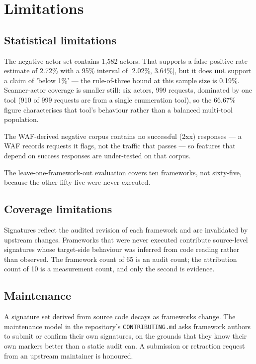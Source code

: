 \documentclass[11pt]{article}
\begin{document}
\section{Limitations}
\label{sec:limits}

\subsection{Statistical limitations}
\label{sec:statlimits}

The negative actor set contains 1,582 actors. That supports a false-positive rate estimate of
2.72\% with a 95\% interval of [2.02\%, 3.64\%], but it does \textbf{not} support a claim of
'below 1\%' --- the rule-of-three bound at this sample size is 0.19\%. Scanner-actor coverage is
smaller still: six actors, 999 requests, dominated by one tool (910 of 999 requests are from a
single enumeration tool), so the 66.67\% figure characterises that tool's behaviour rather than
a balanced multi-tool population.

The WAF-derived negative corpus contains no successful (2xx) responses --- a WAF records
requests it flags, not the traffic that passes --- so features that depend on success responses
are under-tested on that corpus.

The leave-one-framework-out evaluation covers ten frameworks, not sixty-five, because the other
fifty-five were never executed.

\subsection{Coverage limitations}
\label{sec:coverlimits}

Signatures reflect the audited revision of each framework and are invalidated by upstream
changes. Frameworks that were never executed contribute source-level signatures whose
target-side behaviour was inferred from code reading rather than observed. The framework count
of 65 is an audit count; the attribution count of 10 is a measurement count, and only the
second is evidence.

\subsection{Maintenance}
\label{sec:maintenance}

A signature set derived from source code decays as frameworks change. The maintenance model in
the repository's \texttt{CONTRIBUTING.md} asks framework authors to submit or confirm their
own signatures, on the grounds that they know their own markers better than a static audit can.
A submission or retraction request from an upstream maintainer is honoured.
\end{document}
